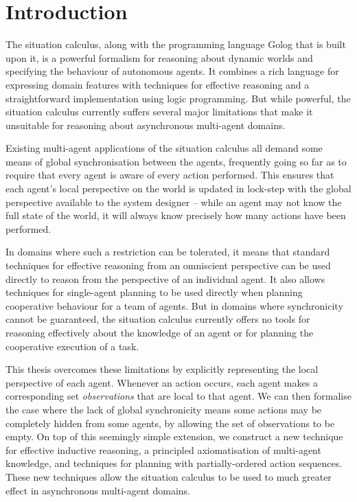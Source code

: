 
\chapter{Introduction}\label{ch:intro}

The situation calculus, along with the programming language Golog
that is built upon it, is a powerful formalism for reasoning about
dynamic worlds and specifying the behaviour of autonomous agents.
It combines a rich language for expressing domain features with techniques
for effective reasoning and a straightforward implementation using
logic programming. But while powerful, the situation calculus currently
suffers several major limitations that make it unsuitable for reasoning
about asynchronous multi-agent domains.

Existing multi-agent applications of the situation calculus all demand
some means of global synchronisation between the agents, frequently
going so far as to require that every agent is aware of every action
performed. This ensures that each agent's local perspective on the
world is updated in lock-step with the global perspective available
to the system designer -- while an agent may not know the full state
of the world, it will always know precisely how many actions have
been performed.

In domains where such a restriction can be tolerated, it means that
standard techniques for effective reasoning from an omniscient perspective
can be used directly to reason from the perspective of an individual
agent. It also allows techniques for single-agent planning to be used
directly when planning cooperative behaviour for a team of agents.
But in domains where synchronicity cannot be guaranteed, the situation
calculus currently offers no tools for reasoning effectively about
the knowledge of an agent or for planning the cooperative execution
of a task.

This thesis overcomes these limitations by explicitly representing
the local perspective of each agent. Whenever an action occurs, each
agent makes a corresponding set \emph{observations} that are local
to that agent. We can then formalise the case where the lack of global
synchronicity means some actions may be completely hidden from some
agents, by allowing the set of observations to be empty. On top of
this seemingly simple extension, we construct a new technique for
effective inductive reasoning, a principled axiomatisation of multi-agent
knowledge, and techniques for planning with partially-ordered action
sequences. These new techniques allow the situation calculus to be
used to much greater effect in asynchronous multi-agent domains. 


